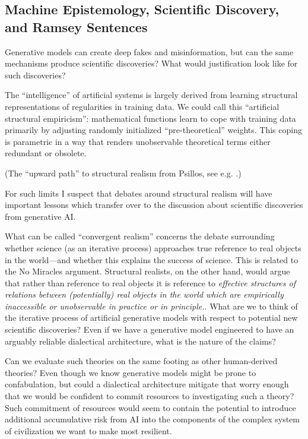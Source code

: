 \documentclass[11pt, oneside]{article}   	%
\begin{document}
\subsection{Machine Epistemology, Scientific Discovery, and Ramsey Sentences}

Generative models can create deep fakes and misinformation, but can the same mechanisms produce scientific discoveries?  What would justification look like for such discoveries?




The ``intelligence'' of artificial systems is largely derived from learning structural representations of regularities in training data. We could call this ``artificial structural empiricism'': mathematical functions learn to cope with training data primarily by adjusting randomly initialized ``pre-theoretical'' weights.  This coping is parametric in a way that renders unobservable theoretical terms either redundant or obsolete.  

(The ``upward path'' to structural realism from Psillos, see e.g. \citep[\S 3]{sep-structural-realism}.)

For such limits I suspect that debates around structural realism will have important lessons which transfer over to the discussion about scientific discoveries from generative AI.  

What can be called ``convergent realism'' concerns the debate surrounding whether science (as an iterative process) approaches true reference to real objects in the world---and whether this explains the success of science.  This is related to the No Miracles argument.  Structural realists, on the other hand, would argue that rather than reference to real objects it is reference to \emph{effective structures of relations between (potentially) real objects in the world which are empirically inaccessible or unobservable in practice or in principle.}.  What are we to think of the iterative process of artificial generative models with respect to potential new scientific discoveries? Even if we have a generative model engineered to have an arguably reliable dialectical architecture, what is the nature of the claims?  

Can we evaluate such theories on the same footing as other human-derived theories?  Even though we know generative models might be prone to confabulation, but could a dialectical architecture mitigate that worry enough that we would be confident to commit resources to investigating such a theory?  Such commitment of resources would seem to contain the potential to introduce additional accumulative risk from AI into the components of the complex system of civilization we want to make most resilient.
\end{document}
